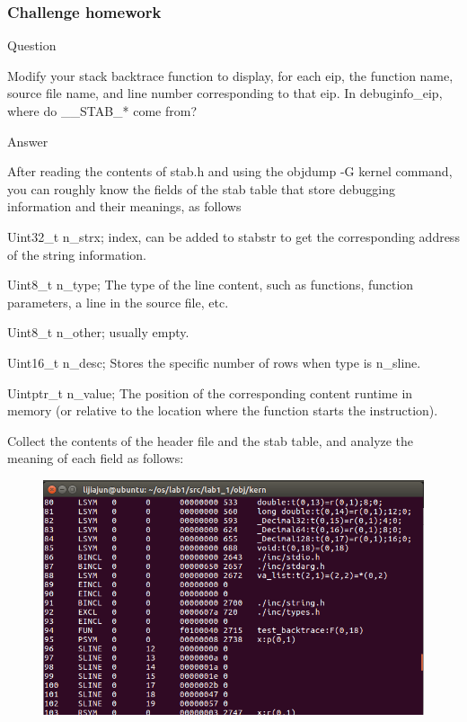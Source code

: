 \subsubsection{Challenge homework}
\begin{flushleft}
{\Large Question}
\end{flushleft}

Modify your stack backtrace function to display, for each eip, the function name, source file name, and line number corresponding to that eip.
In debuginfo\_eip, where do \_\_STAB\_* come from?

\begin{flushleft}
{\Large Answer}
\end{flushleft}


After reading the contents of stab.h and using the objdump -G kernel command, you can roughly know the fields of the stab table that store debugging information and their meanings, as follows

Uint32\_t n\_strx; index, can be added to stabstr to get the corresponding address of the string information.

Uint8\_t n\_type; The type of the line content, such as functions, function parameters, a line in the source file, etc.

Uint8\_t n\_other; usually empty.

Uint16\_t n\_desc; Stores the specific number of rows when type is n\_sline.

Uintptr\_t n\_value; The position of the corresponding content runtime in memory (or relative to the location where the function starts the instruction).

Collect the contents of the header file and the stab table, and analyze the meaning of each field as follows:
\begin{figure}[H]
  \centering
  \includegraphics[width=0.8\linewidth]{figure/challenge_1}
\end{figure}

